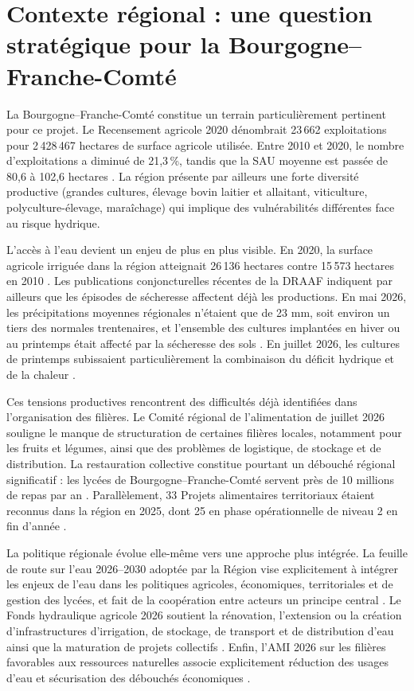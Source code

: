\documentclass[11pt,a4paper]{article}
\begin{document}
\section{Contexte régional : une question stratégique pour la Bourgogne--Franche-Comté}

La Bourgogne--Franche-Comté constitue un terrain particulièrement pertinent pour ce projet. Le Recensement agricole 2020 dénombrait 23\,662 exploitations pour 2\,428\,467 hectares de surface agricole utilisée. Entre 2010 et 2020, le nombre d'exploitations a diminué de 21,3\,\%, tandis que la SAU moyenne est passée de 80,6 à 102,6 hectares \citep{DRAAF_RA2020}. La région présente par ailleurs une forte diversité productive (grandes cultures, élevage bovin laitier et allaitant, viticulture, polyculture-élevage, maraîchage) qui implique des vulnérabilités différentes face au risque hydrique.

L'accès à l'eau devient un enjeu de plus en plus visible. En 2020, la surface agricole irriguée dans la région atteignait 26\,136 hectares contre 15\,573 hectares en 2010 \citep{DRAAF_RA2020}. Les publications conjoncturelles récentes de la DRAAF indiquent par ailleurs que les épisodes de sécheresse affectent déjà les productions. En mai 2026, les précipitations moyennes régionales n'étaient que de 23 mm, soit environ un tiers des normales trentenaires, et l'ensemble des cultures implantées en hiver ou au printemps était affecté par la sécheresse des sols \citep{DRAAF_Mai2026}. En juillet 2026, les cultures de printemps subissaient particulièrement la combinaison du déficit hydrique et de la chaleur \citep{DRAAF_Juillet2026}.

Ces tensions productives rencontrent des difficultés déjà identifiées dans l'organisation des filières. Le Comité régional de l'alimentation de juillet 2026 souligne le manque de structuration de certaines filières locales, notamment pour les fruits et légumes, ainsi que des problèmes de logistique, de stockage et de distribution. La restauration collective constitue pourtant un débouché régional significatif : les lycées de Bourgogne--Franche-Comté servent près de 10 millions de repas par an \citep{DRAAF_CRALIM2026}. Parallèlement, 33 Projets alimentaires territoriaux étaient reconnus dans la région en 2025, dont 25 en phase opérationnelle de niveau 2 en fin d'année \citep{DRAAF_PAT2025}.

La politique régionale évolue elle-même vers une approche plus intégrée. La feuille de route sur l'eau 2026--2030 adoptée par la Région vise explicitement à intégrer les enjeux de l'eau dans les politiques agricoles, économiques, territoriales et de gestion des lycées, et fait de la coopération entre acteurs un principe central \citep{Region_Eau2026}. Le Fonds hydraulique agricole 2026 soutient la rénovation, l'extension ou la création d'infrastructures d'irrigation, de stockage, de transport et de distribution d'eau ainsi que la maturation de projets collectifs \citep{DRAAF_Hydraulique2026}. Enfin, l'AMI 2026 sur les filières favorables aux ressources naturelles associe explicitement réduction des usages d'eau et sécurisation des débouchés économiques \citep{DRAAF_AMI2026}.
\end{document}

